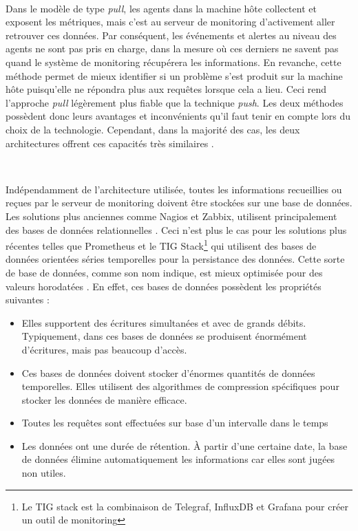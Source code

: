 ~

\noindent
Dans le modèle de type \textit{pull}, les agents dans la machine hôte collectent et exposent les métriques, mais c’est au serveur de monitoring d’activement aller retrouver ces données. Par conséquent, les événements et alertes au niveau des agents ne sont pas pris en charge, dans la mesure où ces derniers ne savent pas quand le système de monitoring récupérera les informations. En revanche, cette méthode permet de mieux identifier si un problème s'est produit sur la machine hôte puisqu’elle ne répondra plus aux requêtes lorsque cela a lieu.\cite{prometheus_doc_pull_push} Ceci rend l’approche \textit{pull} légèrement plus fiable que la technique \textit{push}. Les deux méthodes possèdent donc leurs avantages et inconvénients qu’il faut tenir en compte lors du choix de la technologie. Cependant, dans la majorité des cas, les deux architectures offrent ces capacités très similaires \cite{interview_push_pull}.

~

\noindent
Indépendamment de l’architecture utilisée, toutes les informations recueillies ou reçues par le serveur de monitoring doivent être stockées sur une base de données. Les solutions plus anciennes comme Nagios et Zabbix, utilisent principalement des bases de données relationnelles \cite{nagios_db, zabbix_db}. Ceci n’est plus le cas pour les solutions plus récentes telles que Prometheus et le TIG Stack\footnote{Le TIG stack est la combinaison de Telegraf, InfluxDB et Grafana pour créer un outil de monitoring} qui utilisent des bases de données orientées séries temporelles pour la persistance des données. Cette sorte de base de données, comme son nom indique, est mieux optimisée pour des valeurs horodatées \cite{time_series_fr}. En effet, ces bases de données possèdent les propriétés suivantes \cite{alibaba_timeseries}:

\begin{itemize}
  \item Elles supportent des écritures simultanées et avec de grands débits. Typiquement, dans ces bases de données se produisent énormément d’écritures, mais pas beaucoup d’accès.
  \item Ces bases de données doivent stocker d’énormes quantités de données temporelles. Elles utilisent des algorithmes de compression spécifiques pour stocker les données de manière efficace. \cite{di2007efficient}
  \item Toutes les requêtes sont effectuées sur base d’un intervalle dans le temps
  \item Les données ont une durée de rétention. À partir d’une certaine date, la base de données élimine automatiquement les informations car elles sont jugées non utiles.
\end{itemize}

